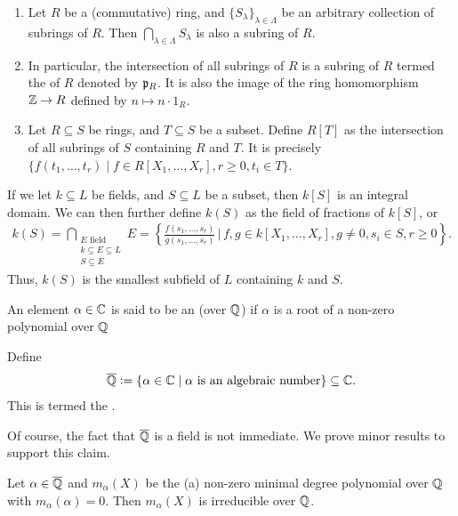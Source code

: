 \begin{enumerate}
    \item Let $R$ be a (commutative) ring, and $\{S_{\lambda}\}_{\lambda \in \Lambda}$ be an arbitrary collection of subrings of $R$. Then $\bigcap_{\lambda \in \Lambda} S_{\lambda}$ is also a subring of $R$.
    \item In particular, the intersection of all subrings of $R$ is a subring of $R$ termed the  of $R$ denoted by $\mathfrak{p}_{R}$. It is also the image of the ring homomorphism $\mathbb{Z} \to R$ defined by $n \mapsto n\cdot 1_{R}$.
    \item Let $R \subseteq S$ be rings, and $T \subseteq S$ be a subset. Define $R[T]$ as the intersection of all subrings of $S$ containing $R$ and $T$. It is precisely $\{f(t_{1},\ldots,t_{r}) \mid f \in R[X_{1},\ldots,X_{r}], r \geq 0, t_{i} \in T\}$.
\end{enumerate}
If we let $k \subseteq L$ be fields, and $S \subseteq L$ be a subset, then $k[S]$ is an integral domain. We can then further define $k(S)$ as the field of fractions of $k[S]$, or
\begin{align}
    k(S) = \bigcap_{\substack{E \text{ field} \\ k \subseteq E \subseteq L \\ S \subseteq E}} E = \left\{\frac{f(s_{1},\ldots,s_{r})}{g(s_{1},\ldots,s_{r})} \, \Bigg| \, f,g \in k[X_{1},\ldots,X_{r}], g \neq 0, s_{i} \in S, r \geq 0\right\}.
\end{align}
Thus, $k(S)$ is the smallest subfield of $L$ containing $k$ and $S$. 

\begin{definition}
    An element $\alpha \in \mathbb{C}$ is said to be an  (over $\mathbb{Q}$) if $\alpha$ is a root of a non-zero polynomial over $\mathbb{Q}$
\end{definition}

\begin{definition}
    Define
    \begin{align}
        \overline{\mathbb{Q}} \vcentcolon= \{\alpha \in \mathbb{C} \mid \alpha \text{ is an algebraic number}\} \subseteq \mathbb{C}.
    \end{align}
    This is termed the .
\end{definition}
Of course, the fact that $\overline{\mathbb{Q}}$ is a field is not immediate. We prove minor results to support this claim.

\begin{lemma}
    Let $\alpha \in \overline{\mathbb{Q}}$ and $m_{\alpha}(X)$ be the (a) non-zero minimal degree polynomial over $\mathbb{Q}$ with $m_{\alpha}(\alpha) = 0$. Then $m_{\alpha}(X)$ is irreducible over $\mathbb{Q}$.
\end{lemma}

